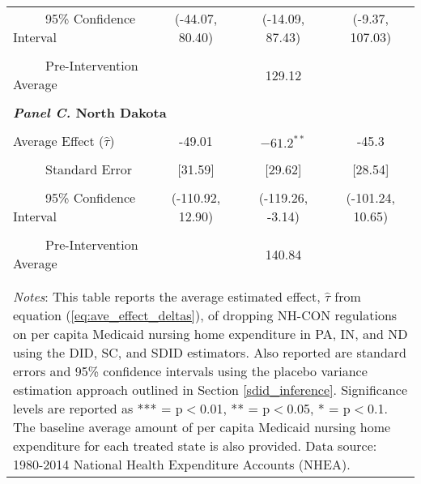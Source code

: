 \documentclass[../Main.tex]{subfiles}
\begin{document}
\begin{table}[htbp]
\begin{tabular}{l*{3}{c}}
\multicolumn{1}{l}{\ \ \ \ \ 95\% Confidence Interval}&   \multicolumn{1}{c}{(-44.07, 80.40)}&   \multicolumn{1}{c}{(-14.09, 87.43)}&   \multicolumn{1}{c}{(-9.37, 107.03)}\\
\\[-2ex]
\multicolumn{1}{l}{\ \ \ \ \ Pre-Intervention Average}&   \multicolumn{3}{c}{129.12}\\
\\[-.1ex]
\multicolumn{4}{l}{\textbf{\textit{Panel C.} North Dakota}}\\
\\[-1.5ex]
\multicolumn{1}{l}{Average Effect ($\hat{\tau}$)}&   \multicolumn{1}{c}{-49.01} &   \multicolumn{1}{c}{$-61.2^{**}$}&  \multicolumn{1}{c}{-45.3}\\
\\[-2ex]
\multicolumn{1}{l}{\ \ \ \ \ Standard Error}  &\multicolumn{1}{c}{[31.59]}&\multicolumn{1}{c}{[29.62]}&\multicolumn{1}{c}{[28.54]}\\
\\[-2ex]
\multicolumn{1}{l}{\ \ \ \ \ 95\% Confidence Interval}&   \multicolumn{1}{c}{(-110.92, 12.90)}&   \multicolumn{1}{c}{(-119.26, -3.14)}&   \multicolumn{1}{c}{(-101.24, 10.65)}\\
\\[-2ex]
\multicolumn{1}{l}{\ \ \ \ \ Pre-Intervention Average}&   \multicolumn{3}{c}{140.84}\\
\\[-.1ex]
\hline\hline
\\[-2ex]
\multicolumn{4}{p{.8\linewidth}}{\footnotesize \textit{Notes}: This table reports the average estimated effect, $\hat{\tau}$ from equation (\ref{eq:ave_effect_deltas}), of dropping NH-CON regulations on per capita Medicaid nursing home expenditure in PA, IN, and ND using the DID, SC, and SDID estimators. Also reported are standard errors and 95\% confidence intervals using the placebo variance estimation approach outlined in Section \ref{sdid_inference}. Significance levels are reported as *** = p$<$0.01, ** = p$<$0.05, * = p$<$0.1. The baseline average amount of per capita Medicaid nursing home expenditure for each treated state is also provided. Data source: 1980-2014 National Health Expenditure Accounts (NHEA).}
\end{tabular}
\end{table}
\vfill
\clearpage
\end{document}
